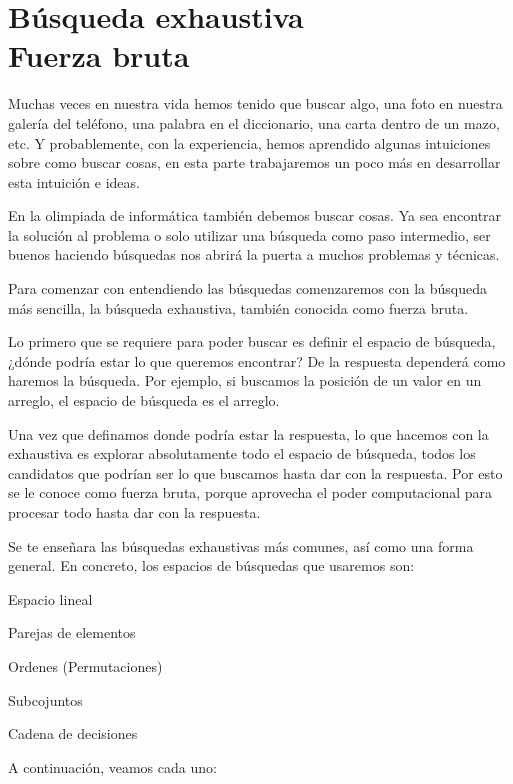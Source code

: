 \chapter[Búsqueda Exhaustiva]{Búsqueda exhaustiva\\ Fuerza bruta}
Muchas veces en nuestra vida hemos tenido que buscar algo, una foto en nuestra galería del teléfono, una palabra en el diccionario, una carta dentro de un mazo, etc. Y probablemente, con la experiencia, hemos aprendido algunas intuiciones sobre como buscar cosas, en esta parte trabajaremos un poco más en desarrollar esta intuición e ideas.

En la olimpiada de informática también debemos buscar cosas. Ya sea encontrar la solución al problema o solo utilizar una búsqueda como paso intermedio, ser buenos haciendo búsquedas nos abrirá la puerta a muchos problemas y técnicas.

Para comenzar con entendiendo las búsquedas comenzaremos con la búsqueda más sencilla, la búsqueda exhaustiva, también conocida como fuerza bruta. 

Lo primero que se requiere para poder buscar es definir el espacio de búsqueda, ¿dónde podría estar lo que queremos encontrar? De la respuesta dependerá como haremos la búsqueda. Por ejemplo, si buscamos la posición de un valor en un arreglo, el espacio de búsqueda es el arreglo.

Una vez que definamos donde podría estar la respuesta, lo que hacemos con la exhaustiva es explorar absolutamente todo el espacio de búsqueda, todos los candidatos que podrían ser lo que buscamos hasta dar con la respuesta. Por esto se le conoce como fuerza bruta, porque aprovecha el poder computacional para procesar todo hasta dar con la respuesta.

Se te enseñara las búsquedas exhaustivas más comunes, así como una forma general. En concreto, los espacios de búsquedas que usaremos son:

\begin{plimits}
	\item Espacio lineal
	\item Parejas de elementos
	\item Ordenes (Permutaciones)
	\item Subcojuntos
	\item Cadena de decisiones
\end{plimits}
 
 A continuación, veamos cada uno:
 



